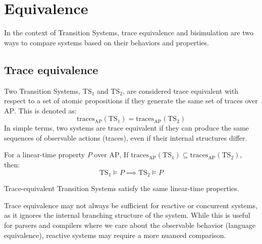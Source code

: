 \section{Equivalence}

In the context of Transition Systems, trace equivalence and bisimulation are two ways to compare systems based on their behaviors and properties.

\subsection{Trace equivalence}
Two Transition Systems, $\text{TS}_1$ and $\text{TS}_2$, are considered trace equivalent with respect to a set of atomic propositions if they generate the same set of traces over $\text{AP}$. 
This is denoted as:
\[\text{traces}_{\text{AP}}(\text{TS}_1)=\text{traces}_{\text{AP}}(\text{TS}_2)\]
\noindent In simple terms, two systems are trace equivalent if they can produce the same sequences of observable actions (traces), even if their internal structures differ.
\begin{theorem}
    For a linear-time property $P$ over $\text{AP}$, If $\text{traces}_{\text{AP}}(\text{TS}_1)\subseteq\text{traces}_{\text{AP}}(\text{TS}_2)$, then: 
    \[\text{TS}_1\models P \implies \text{TS}_2\models P\]
\end{theorem}
\begin{corollary}
    Trace-equivalent Transition Systems satisfy the same linear-time properties.
\end{corollary}
\noindent Trace equivalence may not always be sufficient for reactive or concurrent systems, as it ignores the internal branching structure of the system. 
While this is useful for parsers and compilers where we care about the observable behavior (language equivalence), reactive systems may require a more nuanced comparison.

